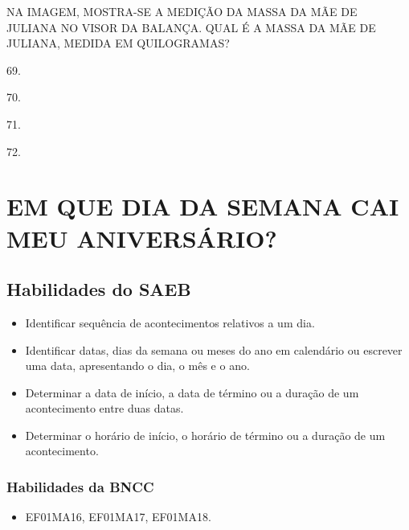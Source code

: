 NA IMAGEM, MOSTRA-SE A MEDIÇÃO DA MASSA DA MÃE DE JULIANA NO VISOR DA
BALANÇA. QUAL É A MASSA DA MÃE DE JULIANA, MEDIDA EM QUILOGRAMAS?

\begin{escolha}
\item 69.

\item 70.

\item 71.

\item 72.
\end{escolha}

\chapter[{EM QUE DIA DA SEMANA CAI MEU ANIVERSÁRIO?}]{\large EM QUE DIA DA SEMANA CAI MEU ANIVERSÁRIO?}


\section{Habilidades do SAEB}

\begin{itemize}
\item Identificar sequência de acontecimentos relativos a um dia.
\item Identificar datas, dias da semana ou meses do ano em calendário ou
escrever uma data, apresentando o dia, o mês e o ano.
\item Determinar a data de início, a data de término ou a duração de um
acontecimento entre duas datas.
\item Determinar o horário de início, o horário de término ou a duração de
um acontecimento.
\end{itemize}

\subsection{Habilidades da BNCC}

\begin{itemize}\enlargethispage{2\baselineskip}
\item EF01MA16, EF01MA17, EF01MA18.
\end{itemize}

